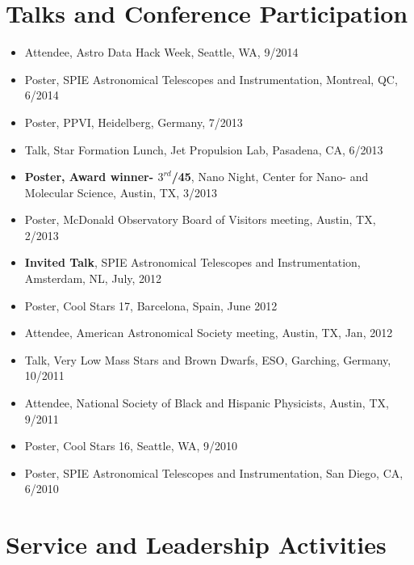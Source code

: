 \documentclass[10pt,letterpaper]{article}
\begin{document}



\section*{Talks and Conference Participation}

\begin{itemize}
    \item Attendee, Astro Data Hack Week, Seattle, WA, 9/2014
    \item Poster, SPIE Astronomical Telescopes and Instrumentation, Montreal, QC, 6/2014
    \item Poster, PPVI, Heidelberg, Germany, 7/2013
    \item Talk, Star Formation Lunch, Jet Propulsion Lab, Pasadena, CA, 6/2013
    \item \textbf{Poster, Award winner- $3^{rd}$/45}, Nano Night, Center for Nano- and Molecular Science, Austin, TX, 3/2013
    \item Poster, McDonald Observatory Board of Visitors meeting, Austin, TX, 2/2013 
    \item \textbf{Invited Talk}, SPIE Astronomical Telescopes and Instrumentation, Amsterdam, NL, July, 2012
    \item Poster, Cool Stars 17, Barcelona, Spain, June 2012
    \item Attendee, American Astronomical Society meeting, Austin, TX, Jan, 2012
    \item Talk, Very Low Mass Stars and Brown Dwarfs, ESO, Garching, Germany, 10/2011
    \item Attendee, National Society of Black and Hispanic Physicists, Austin, TX, 9/2011
    \item Poster, Cool Stars 16, Seattle, WA, 9/2010
    \item Poster, SPIE Astronomical Telescopes and Instrumentation, San Diego, CA, 6/2010
\end{itemize}

\section*{Service and Leadership Activities}
\end{document}
